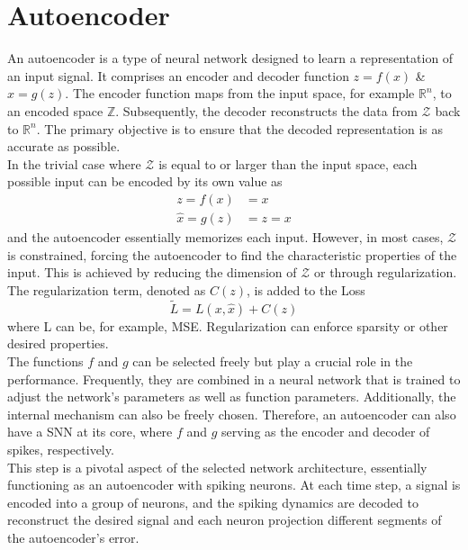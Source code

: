 \section{Autoencoder}
An autoencoder is a type of neural network designed to learn a representation of an input signal. It comprises an encoder and decoder function $z =f(x)$ \& $\hat{x} = g(z)$. The encoder function maps from the input space, for example $\mathbb{R}^n$, to an encoded space $\mathbb{Z}$. Subsequently, the decoder reconstructs the data from $\mathcal{Z}$ back to $\mathbb{R}^n$. The primary objective is to ensure that the decoded representation is as accurate as possible.\\
In the trivial case where $\mathcal{Z}$ is equal to or larger than the input space, each possible input can be encoded by its own value as
\begin{equation}
\begin{aligned}
 	z = f(x) &= x\\
 	\hat{x} = g(z) &= z = x
\end{aligned}
\end{equation}
and the autoencoder essentially memorizes each input. However, in most cases, $\mathcal{Z}$ is constrained, forcing the autoencoder to find the characteristic properties of the input. This is achieved by reducing the dimension of $\mathcal{Z}$ or through regularization. The regularization term, denoted as $C(z)$, is added to the Loss
\begin{equation}
	\tilde{L} = L(x,\hat{x}) + C(z)
\end{equation}
where L can be, for example, MSE. Regularization can enforce sparsity or other desired properties\cite{goodfellow_deep_2016}.\\
The functions $f$ and $g$ can be selected freely but play a crucial role in the performance. Frequently, they are combined in a neural network that is trained to adjust the network's parameters as well as function parameters. Additionally, the internal mechanism can also be freely chosen. Therefore, an autoencoder can also have a \ac{SNN} at its core, where $f$ and $g$ serving as the encoder and decoder of spikes, respectively.\\
This step is a pivotal aspect of the selected network architecture, essentially functioning as an autoencoder with spiking neurons. At each time step, a signal is encoded into a group of neurons, and the spiking dynamics are decoded to reconstruct the desired signal and each neuron projection different segments of the autoencoder's error.\\

